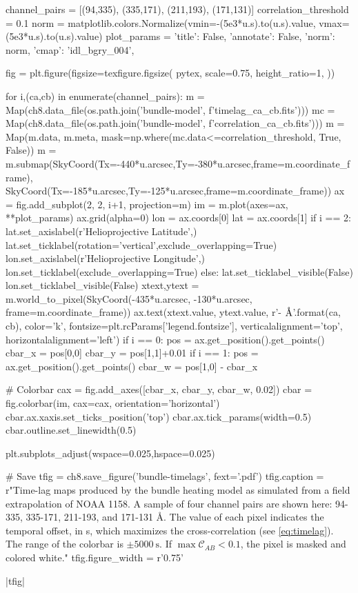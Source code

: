 \begin{pycode}[chapter8]
channel_pairs = [(94,335), (335,171), (211,193), (171,131)]
correlation_threshold = 0.1
norm = matplotlib.colors.Normalize(vmin=-(5e3*u.s).to(u.s).value,
                                   vmax=(5e3*u.s).to(u.s).value)
plot_params = { 'title': False, 'annotate': False, 'norm': norm, 'cmap': 'idl_bgry_004',}

fig = plt.figure(figsize=texfigure.figsize(
    pytex,
    scale=0.75,
    height_ratio=1,
))

for i,(ca,cb) in enumerate(channel_pairs):
    m = Map(ch8.data_file(os.path.join('bundle-model', f'timelag_{ca}_{cb}.fits')))
    mc = Map(ch8.data_file(os.path.join('bundle-model', f'correlation_{ca}_{cb}.fits')))
    m = Map(m.data, m.meta, mask=np.where(mc.data<=correlation_threshold, True, False))
    m = m.submap(SkyCoord(Tx=-440*u.arcsec,Ty=-380*u.arcsec,frame=m.coordinate_frame),
                 SkyCoord(Tx=-185*u.arcsec,Ty=-125*u.arcsec,frame=m.coordinate_frame))
    ax = fig.add_subplot(2, 2, i+1, projection=m)
    im = m.plot(axes=ax, **plot_params)
    ax.grid(alpha=0)
    lon = ax.coords[0]
    lat = ax.coords[1]
    if i == 2:
        lat.set_axislabel(r'Helioprojective Latitude',)
        lat.set_ticklabel(rotation='vertical',exclude_overlapping=True)
        lon.set_axislabel(r'Helioprojective Longitude',)
        lon.set_ticklabel(exclude_overlapping=True)
    else:
        lat.set_ticklabel_visible(False)
        lon.set_ticklabel_visible(False)
    xtext,ytext = m.world_to_pixel(SkyCoord(-435*u.arcsec, -130*u.arcsec, frame=m.coordinate_frame))
    ax.text(xtext.value, ytext.value, r'{}-{} $\si{{\angstrom}}$'.format(ca, cb),
            color='k', fontsize=plt.rcParams['legend.fontsize'],
            verticalalignment='top', horizontalalignment='left')
    if i == 0:
        pos = ax.get_position().get_points()
        cbar_x = pos[0,0]
        cbar_y = pos[1,1]+0.01
    if i == 1:
        pos = ax.get_position().get_points()
        cbar_w = pos[1,0] - cbar_x 

# Colorbar
cax = fig.add_axes([cbar_x, cbar_y, cbar_w, 0.02])
cbar = fig.colorbar(im, cax=cax, orientation='horizontal')
cbar.ax.xaxis.set_ticks_position('top')
cbar.ax.tick_params(width=0.5)
cbar.outline.set_linewidth(0.5)

plt.subplots_adjust(wspace=0.025,hspace=0.025)

# Save
tfig = ch8.save_figure('bundle-timelags', fext='.pdf')
tfig.caption = r"Time-lag maps produced by the bundle heating model as simulated from a field extrapolation of \AR{} NOAA 1158. A sample of four channel pairs are shown here: 94-335, 335-171, 211-193, and 171-131 \si{\angstrom}. The value of each pixel indicates the temporal offset, in \si{\second}, which maximizes the cross-correlation (see \autoref{eq:timelag}). The range of the colorbar is $\pm\SI{5000}{\second}$. If $\max{\mathcal{C}_{AB}}<0.1$, the pixel is masked and colored white."
tfig.figure_width = r'0.75\textwidth'
\end{pycode}
\py[chapter8]|tfig|

